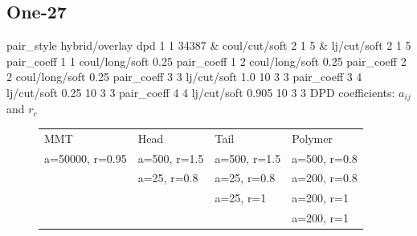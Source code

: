 \documentclass[a4paper]{article}
\begin{document}
\subsection*{One-27}
pair\_style hybrid/overlay dpd 1 1 34387 \& coul/cut/soft 2 1 5 \& 
lj/cut/soft 2 1 5\newline
pair\_coeff 1 1 coul/long/soft 0.25\newline
pair\_coeff 1 2 coul/long/soft 0.25\newline
pair\_coeff 2 2 coul/long/soft 0.25\newline
pair\_coeff 3 3 lj/cut/soft 1.0   10 3 3\newline
pair\_coeff 3 4 lj/cut/soft 0.25  10 3 3\newline
pair\_coeff 4 4 lj/cut/soft 0.905 10 3 3\newline
DPD coefficients: $a_{ij}$ and $r_c$
\begin{figure}[H]\begin{tabular}{llll}
MMT             & Head         & Tail         & Polymer      \\
a=50000, r=0.95 & a=500, r=1.5 & a=500, r=1.5 & a=500, r=0.8 \\
                & a=25,  r=0.8 & a=25,  r=0.8 & a=200, r=0.8 \\
                &              & a=25,  r=1   & a=200, r=1   \\
                &              &              & a=200, r=1   \\
\end{tabular}\end{figure}
\end{document}

